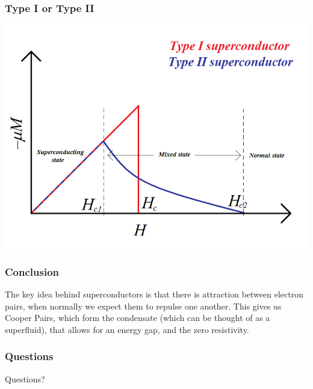 \documentclass[10pt]{beamer}
\theoremstyle{definition}
\begin{document}
\begin{frame}
    \frametitle{Type I or Type II}

    \begin{center}
    \includegraphics[scale = 0.3]{Magnetisation_and_superconductors}
    \end{center}

\end{frame}

\begin{frame}
    \frametitle{Conclusion}

    The key idea behind superconductors is that there is attraction between
    electron pairs, when normally we expect them to repulse one another. This
    gives us Cooper Pairs, which form the condensate (which can be thought of
    as a superfluid), that allows for an energy gap, and the zero resistivity.

\end{frame}

\begin{frame}
    \frametitle{Questions}

    Questions?


\end{frame}
\end{document}
